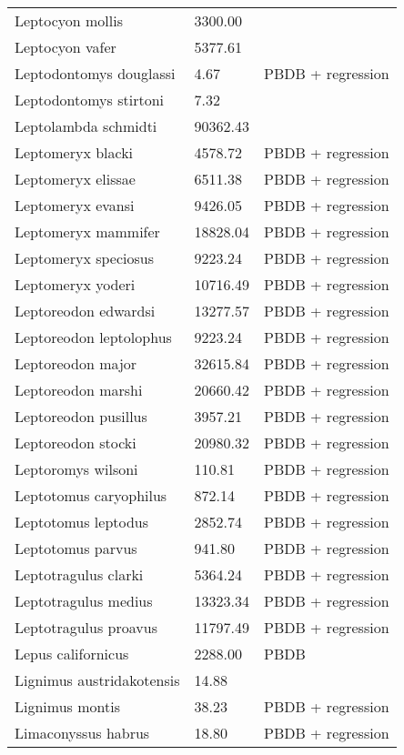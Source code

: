 \documentclass{article}
\begin{document}
\begin{center}
\begin{longtable}{p{} p{} p{} }
  Leptocyon mollis & 3300.00 & \cite{McKenna2011} \\ 
  Leptocyon vafer & 5377.61 & \cite{Tomiya2013} \\ 
  Leptodontomys douglassi & 4.67 & PBDB + regression \\ 
  Leptodontomys stirtoni & 7.32 & \cite{Stock1937} \\ 
  Leptolambda schmidti & 90362.43 & \cite{Zack2005} \\ 
  Leptomeryx blacki & 4578.72 & PBDB + regression \\ 
  Leptomeryx elissae & 6511.38 & PBDB + regression \\ 
  Leptomeryx evansi & 9426.05 & PBDB + regression \\ 
  Leptomeryx mammifer & 18828.04 & PBDB + regression \\ 
  Leptomeryx speciosus & 9223.24 & PBDB + regression \\ 
  Leptomeryx yoderi & 10716.49 & PBDB + regression \\ 
  Leptoreodon edwardsi & 13277.57 & PBDB + regression \\ 
  Leptoreodon leptolophus & 9223.24 & PBDB + regression \\ 
  Leptoreodon major & 32615.84 & PBDB + regression \\ 
  Leptoreodon marshi & 20660.42 & PBDB + regression \\ 
  Leptoreodon pusillus & 3957.21 & PBDB + regression \\ 
  Leptoreodon stocki & 20980.32 & PBDB + regression \\ 
  Leptoromys wilsoni & 110.81 & PBDB + regression \\ 
  Leptotomus caryophilus & 872.14 & PBDB + regression \\ 
  Leptotomus leptodus & 2852.74 & PBDB + regression \\ 
  Leptotomus parvus & 941.80 & PBDB + regression \\ 
  Leptotragulus clarki & 5364.24 & PBDB + regression \\ 
  Leptotragulus medius & 13323.34 & PBDB + regression \\ 
  Leptotragulus proavus & 11797.49 & PBDB + regression \\ 
  Lepus californicus & 2288.00 & PBDB \\ 
  Lignimus austridakotensis & 14.88 & \cite{Tomiya2013} \\ 
  Lignimus montis & 38.23 & PBDB + regression \\ 
  Limaconyssus habrus & 18.80 & PBDB + regression \\ 

\end{longtable}
\end{center}
\end{document}
